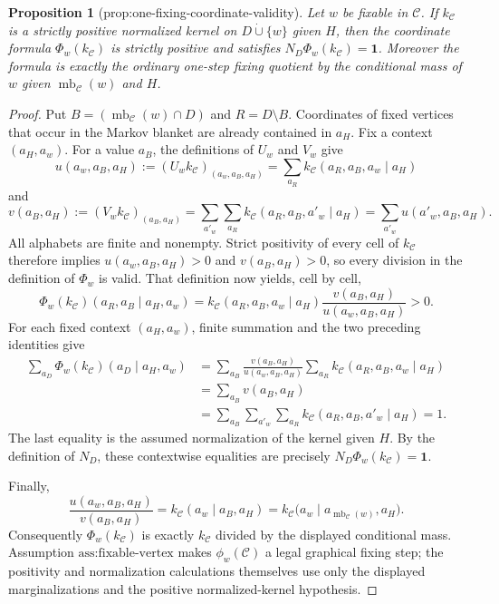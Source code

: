 \documentclass{article}
\newtheorem{proposition}{Proposition}
\begin{document}
\begin{proposition}[prop:one-fixing-coordinate-validity]\label{prop:one-fixing-coordinate-validity}
Let \(w\) be fixable in \(\mathcal C\). If \(k_{\mathcal C}\) is a strictly positive normalized kernel on \(D\mathbin{\dot\cup}\{w\}\) given \(H\), then the coordinate formula \(\Phi_w(k_{\mathcal C})\) is strictly positive and satisfies \(N_D\Phi_w(k_{\mathcal C})=\mathbf 1\). Moreover the formula is exactly the ordinary one-step fixing quotient by the conditional mass of \(w\) given \(\operatorname{mb}_{\mathcal C}(w)\) and \(H\).
\end{proposition}
\begin{proof}
Put \(B=(\operatorname{mb}_{\mathcal C}(w)\cap D)\) and \(R=D\setminus B\).  Coordinates of fixed vertices that occur in the Markov blanket are already contained in \(a_H\).  Fix a context \((a_H,a_w)\).  For a value \(a_B\), the definitions of \(U_w\) and \(V_w\) give
\[
 u(a_w,a_B,a_H):=(U_wk_{\mathcal C})_{(a_w,a_B,a_H)}
   =\sum_{a_R}k_{\mathcal C}(a_R,a_B,a_w\mid a_H)
\]
and
\[
 v(a_B,a_H):=(V_wk_{\mathcal C})_{(a_B,a_H)}
   =\sum_{a'_w}\sum_{a_R}k_{\mathcal C}(a_R,a_B,a'_w\mid a_H)
   =\sum_{a'_w}u(a'_w,a_B,a_H).
\]
All alphabets are finite and nonempty.  Strict positivity of every cell of \(k_{\mathcal C}\) therefore implies \(u(a_w,a_B,a_H)>0\) and \(v(a_B,a_H)>0\), so every division in the definition of \(\Phi_w\) is valid.  That definition now yields, cell by cell,
\[
 \Phi_w(k_{\mathcal C})(a_R,a_B\mid a_H,a_w)
 =k_{\mathcal C}(a_R,a_B,a_w\mid a_H)
   \frac{v(a_B,a_H)}{u(a_w,a_B,a_H)}>0.
\]
For each fixed context \((a_H,a_w)\), finite summation and the two preceding identities give
\[
\begin{aligned}
 \sum_{a_D}\Phi_w(k_{\mathcal C})(a_D\mid a_H,a_w)
 &=\sum_{a_B}\frac{v(a_B,a_H)}{u(a_w,a_B,a_H)}
     \sum_{a_R}k_{\mathcal C}(a_R,a_B,a_w\mid a_H)\\
 &=\sum_{a_B}v(a_B,a_H)\\
 &=\sum_{a_B}\sum_{a'_w}\sum_{a_R}
     k_{\mathcal C}(a_R,a_B,a'_w\mid a_H)=1.
\end{aligned}
\]
The last equality is the assumed normalization of the kernel given \(H\).  By the definition of \(N_D\), these contextwise equalities are precisely \(N_D\Phi_w(k_{\mathcal C})=\mathbf 1\).

Finally,
\[
 \frac{u(a_w,a_B,a_H)}{v(a_B,a_H)}
 =k_{\mathcal C}(a_w\mid a_B,a_H)
 =k_{\mathcal C}\bigl(a_w\mid
   a_{\operatorname{mb}_{\mathcal C}(w)},a_H\bigr).
\]
Consequently \(\Phi_w(k_{\mathcal C})\) is exactly \(k_{\mathcal C}\) divided by the displayed conditional mass.  Assumption \(\text{ass:fixable-vertex}\) makes \(\phi_w(\mathcal C)\) a legal graphical fixing step; the positivity and normalization calculations themselves use only the displayed marginalizations and the positive normalized-kernel hypothesis.
\end{proof}
\end{document}
